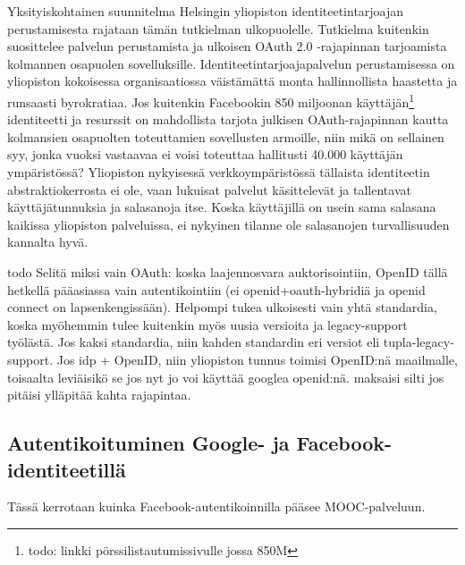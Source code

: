 \documentclass[finnish,gradu]{tktltiki}
\begin{document}
  Yksityiskohtainen suunnitelma Helsingin yliopiston identiteetintarjoajan perustamisesta rajataan tämän tutkielman ulkopuolelle. Tutkielma kuitenkin suosittelee palvelun perustamista ja ulkoisen OAuth 2.0 -rajapinnan tarjoamista kolmannen osapuolen sovelluksille. Identiteetintarjoajapalvelun perustamisessa on yliopiston kokoisessa organisaatiossa väistämättä monta hallinnollista haastetta ja runsaasti byrokratiaa. Jos kuitenkin Facebookin 850 miljoonan käyttäjän\footnote{todo: linkki pörssilistautumissivulle jossa 850M} identiteetti ja resurssit on mahdollista tarjota julkisen OAuth-rajapinnan kautta kolmansien osapuolten toteuttamien sovellusten armoille, niin mikä on sellainen syy, jonka vuoksi vastaavaa ei voisi toteuttaa hallitusti 40.000 käyttäjän ympäristössä? Yliopiston nykyisessä verkkoympäristössä tällaista identiteetin abstraktiokerrosta ei ole, vaan lukuisat palvelut käsittelevät ja tallentavat käyttäjätunnuksia ja salasanoja itse. Koska käyttäjillä on usein sama salasana kaikissa yliopiston palveluissa, ei nykyinen tilanne ole salasanojen turvallisuuden kannalta hyvä.

  todo Selitä miksi vain OAuth: koska laajennosvara auktorisointiin, OpenID tällä hetkellä pääasiassa vain autentikointiin (ei openid+oauth-hybridiä ja openid connect on lapsenkengissään). Helpompi tukea ulkoisesti vain yhtä standardia, koska myöhemmin tulee kuitenkin myös uusia versioita ja legacy-support työlästä. Jos kaksi standardia, niin kahden standardin eri versiot eli tupla-legacy-support. Jos idp + OpenID, niin yliopiston tunnus toimisi OpenID:nä maailmalle, toisaalta leviäisikö se jos nyt jo voi käyttää googlea openid:nä. maksaisi silti jos pitäisi ylläpitää kahta rajapintaa.





  \subsection{Autentikoituminen Google- ja Facebook-identiteetillä} %
  \label{sub:autentikoituminen_facebook}
  Tässä kerrotaan kuinka Facebook-autentikoinnilla pääsee MOOC-palveluun.
\end{document}
